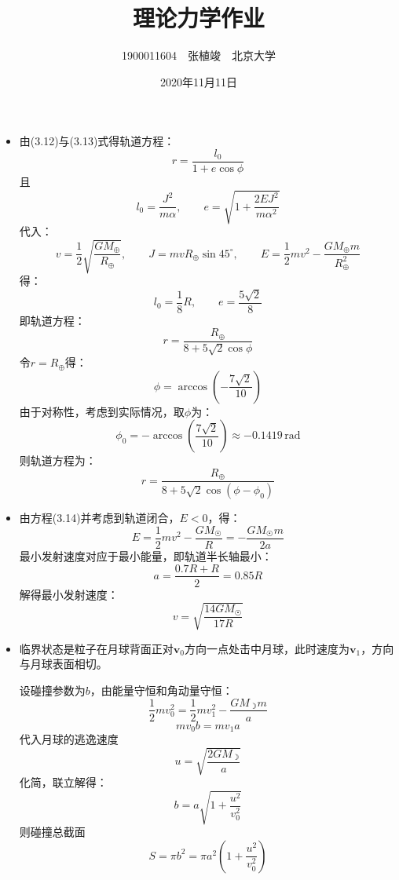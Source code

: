 \documentclass[a4paper,fontset=windows]{ctexart}
\begin{document}
    \title{\textbf{理论力学作业}}
    \author{1900011604\ \ 张植竣\ \ 北京大学}
    \date{2020年11月11日}

    \maketitle

    \begin{itemize}

        \section*{第三章}

        \item[2.1]
        由(3.12)与(3.13)式得轨道方程：
        \[
        r = \frac{l_0}{1+e\cos\phi}
        \]
        且
        \[
        l_0 = \frac{J^2}{m\alpha},\qquad e = \sqrt{1 + \frac{2EJ^2}{m\alpha^2}}
        \]
        代入：
        \[
        v = \frac{1}{2}\sqrt{\frac{GM_\oplus}{R_\oplus}},\qquad J = mvR_\oplus\sin45^\circ,\qquad E = \frac{1}{2}mv^2 - \frac{GM_\oplus m}{R_\oplus^2}
        \]
        得：
        \[
        l_0 = \frac{1}{8}R,\qquad e = \frac{5\sqrt{2}}{8}
        \]
        即轨道方程：
        \[
        r = \frac{R_\oplus}{8+5\sqrt{2}\cos\phi}
        \]
        令$r = R_\oplus$得：
        \[
        \phi = \arccos\left(-\frac{7\sqrt{2}}{10}\right)
        \]
        由于对称性，考虑到实际情况，取$\phi$为：
        \[
        \phi_0 = -\arccos\left(\frac{7\sqrt{2}}{10}\right) \approx -0.1419\,\mathrm{rad}
        \]
        则轨道方程为：
        \[
        r = \frac{R_\oplus}{8+5\sqrt{2}\cos(\phi-\phi_0)}
        \]
        \bigskip

        \item[2.3]
        由方程(3.14)并考虑到轨道闭合，$E<0$，得：
        \[
        E = \frac{1}{2}mv^2 -\frac{GM_{\astrosun}}{R} = -\frac{GM_{\astrosun}m}{2a}
        \]
        最小发射速度对应于最小能量，即轨道半长轴最小：
        \[
        a = \frac{0.7R + R}{2} = 0.85R
        \]
        解得最小发射速度：
        \[
        v = \sqrt{\frac{14GM_{\astrosun}}{17R}}
        \]
        \bigskip

        \item[2.5]
        临界状态是粒子在月球背面正对$\bm{v}_0$方向一点处击中月球，此时速度为$\bm{v}_1$，方向与月球表面相切。

        设碰撞参数为$b$，由能量守恒和角动量守恒：
        \[
        \frac{1}{2}mv_0^2 = \frac{1}{2}mv_1^2 - \frac{GM_{\!\!\rightmoon}m}{a}
        \]
        \[
        mv_0b = mv_1a
        \]
        代入月球的逃逸速度
        \[
        u = \sqrt{\frac{2GM_{\!\!\rightmoon}}{a}}
        \]
        化简，联立解得：
        \[
        b = a\sqrt{1+\frac{u^2}{v_0^2}}
        \]
        则碰撞总截面
        \[
        S = \pi b^2 = \pi a^2\left(1+\frac{u^2}{v_0^2}\right)
        \]
        \bigskip


\end{itemize}
\end{document}
